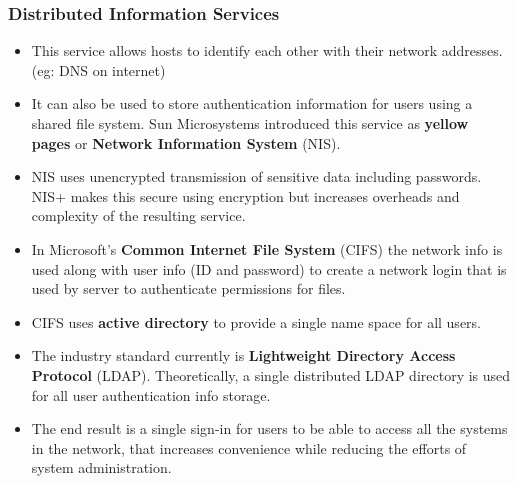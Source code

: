 \documentclass{article}
\theoremstyle{plain}
\theoremstyle{definition}
\begin{document}
\subsubsection{Distributed Information Services}
\begin{itemize}
    \item This service allows hosts to identify each other with their network addresses. (eg: DNS on internet)
    
    \item It can also be used to store authentication information for users using a shared file system. Sun Microsystems introduced this service as \textbf{yellow pages} or \textbf{Network Information System} (NIS).
    
    \item NIS uses unencrypted transmission of sensitive data including passwords. NIS+ makes this secure using encryption but increases overheads and complexity of the resulting service. 
    
    \item In Microsoft's \textbf{Common Internet File System} (CIFS) the network info is used along with user info (ID and password) to create a network login that is used by server to authenticate permissions for files. 
    
    \item CIFS uses \textbf{active directory} to provide a single name space for all users.
    
    \item The industry standard currently is \textbf{Lightweight Directory Access Protocol} (LDAP). Theoretically, a single distributed LDAP directory is used for all user authentication info storage.
    
    \item The end result is a single sign-in for users to be able to access all the systems in the network, that increases convenience while reducing the efforts of system administration. 
\end{itemize}
\end{document}
